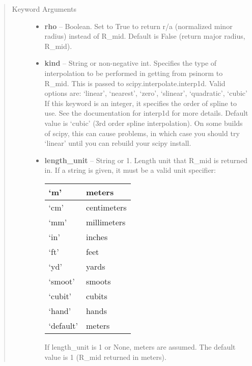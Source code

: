\documentclass[letterpaper,10pt,english]{sphinxmanual}
\begin{document}
\begin{fulllineitems}
\begin{fulllineitems}
\begin{quote}
\begin{description}
\item[{Keyword Arguments}] \leavevmode\begin{itemize}
\item {} 
\textbf{rho} --
Boolean.
Set to True to return r/a (normalized minor radius)
instead of R\_mid. Default is False (return major radius, R\_mid).

\item {} 
\textbf{kind} --
String or non-negative int.
Specifies the type of interpolation
to be performed in getting from psinorm to R\_mid. This is
passed to scipy.interpolate.interp1d. Valid options are:
`linear', `nearest', `zero', `slinear', `quadratic', `cubic'
If this keyword is an integer, it specifies the order of spline
to use. See the documentation for interp1d for more details.
Default value is `cubic' (3rd order spline interpolation). On
some builds of scipy, this can cause problems, in which case
you should try `linear' until you can rebuild your scipy install.

\item {} 
\textbf{length\_unit} --
String or 1.
Length unit that R\_mid is returned in. If
a string is given, it must be a valid unit specifier:

\begin{tabulary}{\linewidth}{|L|L|}
\hline

`m'
 & 
meters
\\\hline

`cm'
 & 
centimeters
\\\hline

`mm'
 & 
millimeters
\\\hline

`in'
 & 
inches
\\\hline

`ft'
 & 
feet
\\\hline

`yd'
 & 
yards
\\\hline

`smoot'
 & 
smoots
\\\hline

`cubit'
 & 
cubits
\\\hline

`hand'
 & 
hands
\\\hline

`default'
 & 
meters
\\\hline
\end{tabulary}


If length\_unit is 1 or None, meters are assumed. The default
value is 1 (R\_mid returned in meters).


\end{itemize}
\end{description}
\end{quote}
\end{fulllineitems}
\end{fulllineitems}
\end{document}
